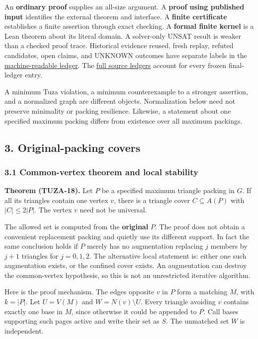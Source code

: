 \documentclass[11pt,a4paper]{article}
\begin{document}
An \textbf{ordinary proof} supplies an all-size argument. A \textbf{proof using published input} identifies the external theorem and interface. A \textbf{finite certificate} establishes a finite assertion through exact checking. A \textbf{formal finite kernel} is a Lean theorem about its literal domain. A solver-only UNSAT result is weaker than a checked proof trace. Historical evidence reused, fresh replay, refuted candidates, open claims, and UNKNOWN outcomes have separate labels in the \href{https://github.com/pappa211/ai-math-experiments/blob/main/verification/tuza-16-19/CLAIMS.json}{machine-readable ledger}. The \href{https://github.com/pappa211/ai-math-experiments/blob/main/verification/tuza-16-19/CLAIM_EVIDENCE.md}{full source ledgers} account for every frozen final-ledger entry.

A minimum Tuza violation, a minimum counterexample to a stronger assertion, and a normalized graph are different objects. Normalization below need not preserve minimality or packing resilience. Likewise, a statement about one specified maximum packing differs from existence over all maximum packings.

\subsection{3. Original-packing covers}\label{original-packing-covers}

\subsubsection{3.1 Common-vertex theorem and local stability}\label{common-vertex-theorem-and-local-stability}

\textbf{Theorem (TUZA-18).} Let \(P\) be a specified maximum triangle packing in \(G\). If all its triangles contain one vertex \(v\), there is a triangle cover \(C\subseteq A(P)\) with \(|C|\le2|P|\). The vertex \(v\) need not be universal.

The allowed set is computed from the \textbf{original} \(P\). The proof does not obtain a convenient replacement packing and quietly use its different support. In fact the same conclusion holds if \(P\) merely has no augmentation replacing \(j\) members by \(j+1\) triangles for \(j=0,1,2\). The alternative local statement is: either one such augmentation exists, or the confined cover exists. An augmentation can destroy the common-vertex hypothesis, so this is not an unrestricted iterative algorithm.

Here is the proof mechanism. The edges opposite \(v\) in \(P\) form a matching \(M\), with \(k=|P|\). Let \(U=V(M)\) and \(W=N(v)\setminus U\). Every triangle avoiding \(v\) contains exactly one base in \(M\), since otherwise it could be appended to \(P\). Call bases supporting such pages active and write their set as \(S\). The unmatched set \(W\) is independent.
\end{document}

